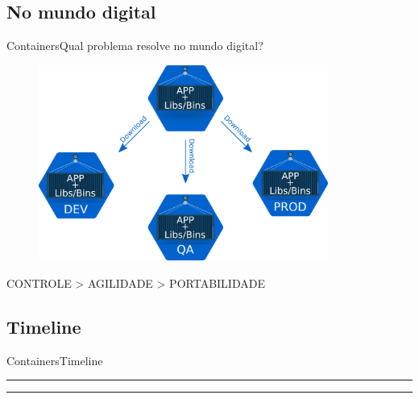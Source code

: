 \subsection{No mundo digital}
\begin{frame}{Containers}{Qual problema resolve no mundo digital?}
 \begin{figure}[ht!]
    \centering
    \includegraphics[width=95mm]{images/container_application.png}
  \end{figure}
  \begin{center}
    CONTROLE > AGILIDADE > PORTABILIDADE
  \end{center}
\end{frame}

\subsection{Timeline}
\begin{frame}{Containers}{Timeline}
  \begin{table}
    \centering
    \begin{minipage}[t]{.9\linewidth}
      \color{gray}
      \rule{\linewidth}{1pt}
      \bigskip
      \rule{\linewidth}{1pt}
    \end{minipage}
  \end{table}
\end{frame}
